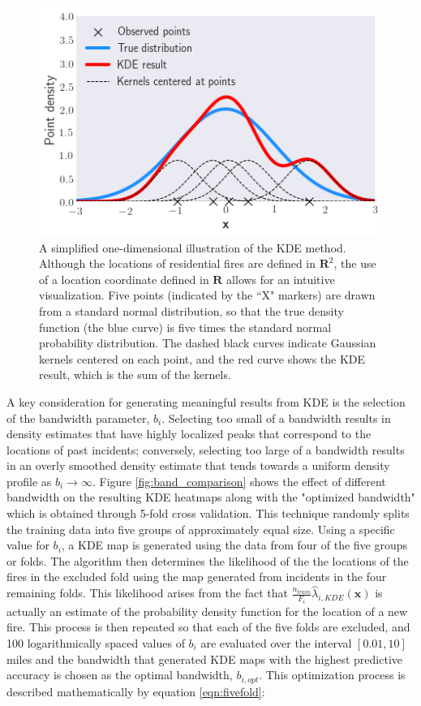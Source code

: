 \documentclass{svjour3}
\begin{document}
\begin{figure}[htb] \centering
\includegraphics[width=.5\textwidth]{./figures/1dkde.png}
\caption{A simplified one-dimensional illustration of the KDE method. Although the locations of residential fires are defined in $\textbf{R}^2$, the use of a location coordinate defined in $\textbf{R}$ allows for an intuitive visualization. Five points (indicated by the ``X" markers) are drawn from a standard normal distribution, so that the true density function (the blue curve) is five times the standard normal probability distribution. The dashed black curves indicate Gaussian kernels centered on each point, and the red curve shows the KDE result, which is the sum of the kernels.}
\label{fig:1dkde}
\end{figure}

A key consideration for generating meaningful results from KDE is the selection of the bandwidth parameter, $b_i$. Selecting too small of a bandwidth results in density estimates that have highly localized peaks that correspond to the locations of past incidents; conversely, selecting too large of a bandwidth results in an overly smoothed density estimate that tends towards a uniform density profile as $b_i \rightarrow  \infty$. Figure \ref{fig:band_comparison} shows the effect of different bandwidth on the resulting KDE heatmaps along with the "optimized bandwidth" which is obtained through 5-fold cross validation. This technique randomly splits the training data into five groups of approximately equal size. Using a specific value for $b_i$, a KDE map is generated using the data from four of the five groups or folds. The algorithm then determines the likelihood of the the locations of the fires in the excluded fold using the map generated from incidents in the four remaining folds. This likelihood arises from the fact that $\frac{n_{train}}{F_i}\hat\lambda_{i,KDE}(\textbf{x})$ is actually an estimate of the probability density function for the location of a new fire. This process is then repeated so that each of the five folds are excluded, and 100 logarithmically spaced values of $b_i$ are evaluated over the interval $[0.01,10]$ miles and the bandwidth that generated KDE maps with the highest predictive accuracy is chosen as the optimal bandwidth, $b_{i,opt}$. This optimization process is described mathematically by equation \ref{eqn:fivefold}:
\end{document}

